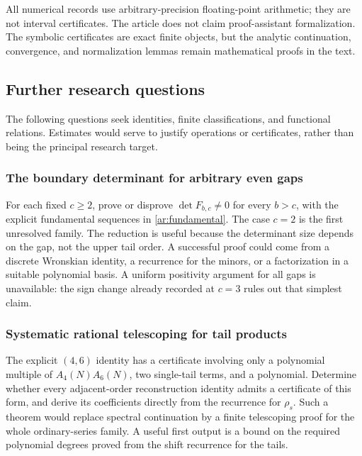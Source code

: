 All numerical records use arbitrary-precision floating-point arithmetic;
they are not interval certificates. The article does not claim
proof-assistant formalization. The symbolic certificates are exact
finite objects, but the analytic continuation, convergence, and
normalization lemmas remain mathematical proofs in the text.

\subsection{Further research questions}
\label{audit:questions}

The following questions seek identities, finite classifications, and
functional relations. Estimates would serve to justify operations or
certificates, rather than being the principal research target.

\subsubsection{The boundary determinant for arbitrary even gaps}

For each fixed $c\ge2$, prove or disprove
$\det F_{b,c}\ne0$ for every $b>c$, with the explicit fundamental
sequences in \eqref{ar:fundamental}. The case $c=2$ is the first
unresolved family. The reduction is useful because the determinant size
depends on the gap, not the upper tail order. A successful proof could
come from a discrete Wronskian identity, a recurrence for the minors,
or a factorization in a suitable polynomial basis. A uniform positivity
argument for all gaps is unavailable: the sign change already recorded
at $c=3$ rules out that simplest claim.

\subsubsection{Systematic rational telescoping for tail products}

The explicit $(4,6)$ identity has a certificate involving only a
polynomial multiple of $A_4(N)A_6(N)$, two single-tail terms, and a
polynomial. Determine whether every adjacent-order reconstruction
identity admits a certificate of this form, and derive its coefficients
directly from the recurrence for $\rho_s$. Such a theorem would replace
spectral continuation by a finite telescoping proof for the whole
ordinary-series family. A useful first output is a bound on the required
polynomial degrees proved from the shift recurrence for the tails.


